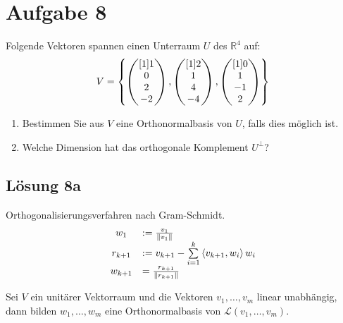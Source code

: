 \documentclass[main.tex]{subfiles}
\begin{document}
\section{Aufgabe 8}
Folgende Vektoren spannen einen Unterraum $U$ des $\mathbb{R}^{4}$ auf:
\begin{equation*}
	V = \left\{
		\begin{pmatrix}[1]  1 \\ 0 \\ 2 \\ -2  \end{pmatrix},
		\begin{pmatrix}[1] 2 \\ 1 \\ 4 \\ -4 \end{pmatrix},
		\begin{pmatrix}[1] 0 \\1 \\ -1 \\ 2  \end{pmatrix}
	\right\}
\end{equation*}

\begin{enumerate}
    \item Bestimmen Sie aus $V$ eine Orthonormalbasis von $U$, falls dies möglich ist.
    \item Welche Dimension hat das orthogonale Komplement $U^{\perp }$?
\end{enumerate}

\subsection{Lösung 8a}
Orthogonalisierungsverfahren nach Gram-Schmidt.
\begin{equation*}
	\begin{array}{ c l }
		w_{1}   & := \frac{v_{1}}{\left\|  v_{1}  \right\| }\\
		r_{k+1} & := v_{k+1} -\sum\limits _{i=1}^{k}\left\langle  v_{k+1} ,w_{i} \right\rangle w_{i}\\
		w_{k+1} &  = \frac{r_{k+1}}{\left\|  r_{k+1}  \right\| }
	\end{array}
\end{equation*}

Sei $V$ ein unitärer Vektorraum und die Vektoren $v_{1} ,\dotsc ,v_{m}$ linear unabhängig, dann bilden $w_{1} ,\dotsc ,w_{m}$ eine Orthonormalbasis von $\mathcal{L}( v_{1} ,\dotsc ,v_{m})$.
\end{document}
